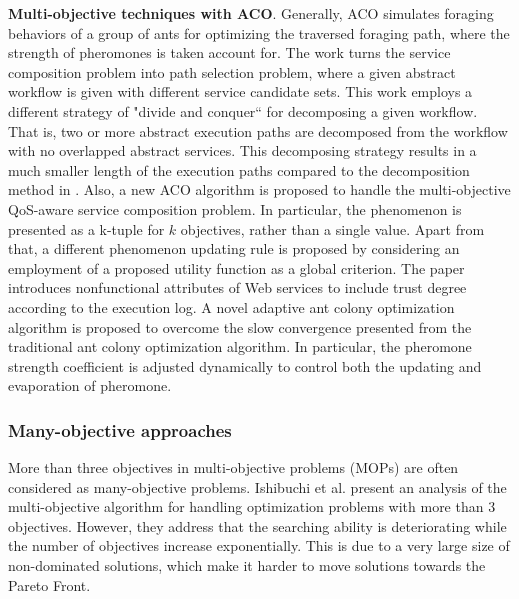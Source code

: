 \textbf{Multi-objective techniques with ACO}. Generally, ACO simulates foraging behaviors of a group of ants for optimizing the traversed foraging path, where the strength of pheromones is taken account for. The work \cite{zhang2010qos} turns the service composition problem into path selection problem, where a given abstract workflow is given with different service candidate sets. This work employs a different strategy of "divide and conquer`` for decomposing a given workflow. That is,  two or more abstract execution paths are decomposed from the workflow with no overlapped abstract services. This decomposing strategy results in a much smaller length of the execution paths compared to the decomposition method in \cite{yu2007efficient}.  Also, a new ACO algorithm is proposed to handle the multi-objective QoS-aware service composition problem. In particular,  the phenomenon is presented as a k-tuple for $k$ objectives, rather than a single value. Apart from that, a different phenomenon updating rule is proposed by considering an employment of a proposed utility function as a global criterion. The paper \cite{wang2014novel} introduces nonfunctional attributes of Web services to include trust degree according to the execution log. A novel adaptive ant colony optimization algorithm is proposed to overcome the slow convergence presented from the traditional ant colony optimization algorithm. In particular, the pheromone strength coefficient is adjusted dynamically to control both the updating and evaporation of pheromone. 

\subsubsection{Many-objective approaches}\label{ManyObjective}

More than three objectives in multi-objective problems (MOPs) are often considered as many-objective problems. Ishibuchi et al. \cite{ishibuchi2008evolutionary} present an analysis of the multi-objective algorithm for handling optimization problems with more than 3 objectives. However, they address that the searching ability is deteriorating while the number of objectives increase exponentially. This is due to a very large size of non-dominated solutions, which make it harder to move solutions towards the Pareto Front.

